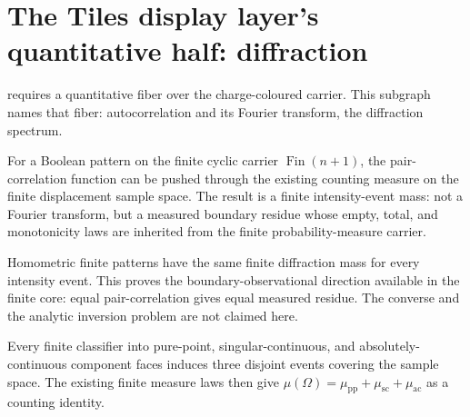 \section{The Tiles display layer's quantitative half: diffraction}

 requires a quantitative fiber over the
charge-coloured carrier.  This subgraph names that fiber: autocorrelation and its
Fourier transform, the diffraction spectrum.

\begin{theorem}\label{thm:finite-diffraction-mass}\leanok{}
For a Boolean pattern on the finite cyclic carrier \(\operatorname{Fin}(n+1)\),
the pair-correlation function can be pushed through the existing counting
measure on the finite displacement sample space.  The result is a finite
intensity-event mass: not a Fourier transform, but a measured boundary residue
whose empty, total, and monotonicity laws are inherited from the finite
probability-measure carrier.
\end{theorem}

\begin{theorem}\label{thm:homometric-finite-diffraction-mass}\leanok{}
Homometric finite patterns have the same finite diffraction mass for every
intensity event.  This proves the boundary-observational direction available in
the finite core: equal pair-correlation gives equal measured residue.  The
converse and the analytic inversion problem are not claimed here.
\end{theorem}

\begin{theorem}\label{thm:finite-diffraction-decomposition-mass}\leanok{}
Every finite classifier into pure-point, singular-continuous, and
absolutely-continuous component faces induces three disjoint events covering the
sample space.  The existing finite measure laws then give
\(\mu(\Omega)=\mu_{\mathrm{pp}}+\mu_{\mathrm{sc}}+\mu_{\mathrm{ac}}\) as a
counting identity.
\end{theorem}

